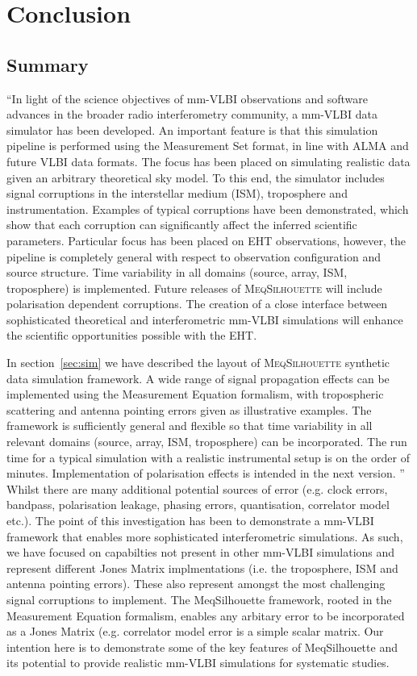 \chapter{Conclusion}
\section{Summary}
``In light of the science objectives of mm-VLBI observations and software advances in the broader radio interferometry community, a mm-VLBI data simulator has been developed. An important feature is that this simulation pipeline is performed using the {\sc Measurement Set} format, in line with ALMA and future VLBI data formats. The focus has been placed on simulating realistic data given an arbitrary theoretical sky model. To this end, the simulator includes signal corruptions in the interstellar medium (ISM), troposphere and instrumentation. Examples of typical corruptions have been demonstrated, which show that each corruption can significantly affect the inferred scientific parameters. Particular focus has been placed on EHT observations, however, the pipeline is completely general with respect to observation configuration and source structure. Time variability in all domains (source, array, ISM, troposphere) is implemented.  Future releases of \textsc{MeqSilhouette} will include polarisation dependent corruptions. The creation of a close interface between sophisticated theoretical and interferometric mm-VLBI simulations will enhance the scientific opportunities possible with the EHT.

In section~\ref{sec:sim} we have described the layout of \textsc{MeqSilhouette} synthetic data simulation framework. A wide range of signal propagation effects can be implemented using the Measurement Equation formalism, with tropospheric scattering and antenna pointing errors given as illustrative examples. The framework is sufficiently general and flexible so that time variability in all relevant domains (source, array, ISM, troposphere) can be incorporated. The run time for a typical simulation with a realistic instrumental setup is on the order of minutes.  Implementation of polarisation effects is intended in the next version. 
''\\
Whilst there are many additional potential sources of error (e.g. clock errors, bandpass, polarisation leakage, phasing errors, quantisation, correlator model etc.). The point of this investigation has been to demonstrate a mm-VLBI framework that enables more sophisticated interferometric simulations. As such, we have focused on capabilties not present in other mm-VLBI simulations and represent different Jones Matrix implmentations (i.e. the troposphere, ISM and antenna pointing errors). These also represent amongst the most challenging signal corruptions to implement. The MeqSilhouette framework, rooted in the Measurement Equation formalism, enables any arbitary error to be incorporated as a Jones Matrix (e.g. correlator model error is a simple scalar matrix. Our intention here is to demonstrate some of the key features of MeqSilhouette and its potential to provide realistic mm-VLBI simulations for systematic studies.


